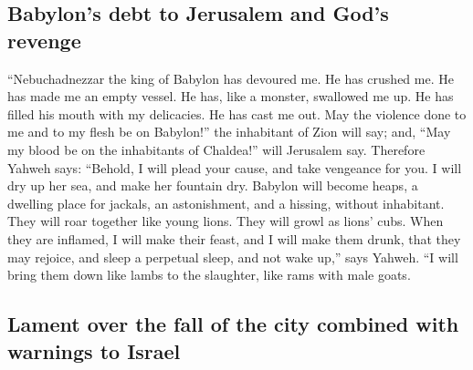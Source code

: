 \hypertarget{babylons-debt-to-jerusalem-and-gods-revenge}{%
\subsection{Babylon's debt to Jerusalem and God's
revenge}\label{babylons-debt-to-jerusalem-and-gods-revenge}}

 ``Nebuchadnezzar the king of Babylon has devoured me. He
has crushed me. He has made me an empty vessel. He has, like a monster,
swallowed me up. He has filled his mouth with my delicacies. He has cast
me out.  May the violence done to me and to my flesh be
on Babylon!'' the inhabitant of Zion will say; and, ``May my blood be on
the inhabitants of Chaldea!'' will Jerusalem say. 
Therefore Yahweh says: ``Behold, I will plead your cause, and take
vengeance for you. I will dry up her sea, and make her fountain dry.
 Babylon will become heaps, a dwelling place for jackals,
an astonishment, and a hissing, without inhabitant.  They
will roar together like young lions. They will growl as lions' cubs.
 When they are inflamed, I will make their feast, and I
will make them drunk, that they may rejoice, and sleep a perpetual
sleep, and not wake up,'' says Yahweh.  ``I will bring
them down like lambs to the slaughter, like rams with male goats.

\hypertarget{lament-over-the-fall-of-the-city-combined-with-warnings-to-israel}{%
\subsection{Lament over the fall of the city combined with warnings to
Israel}\label{lament-over-the-fall-of-the-city-combined-with-warnings-to-israel}}

